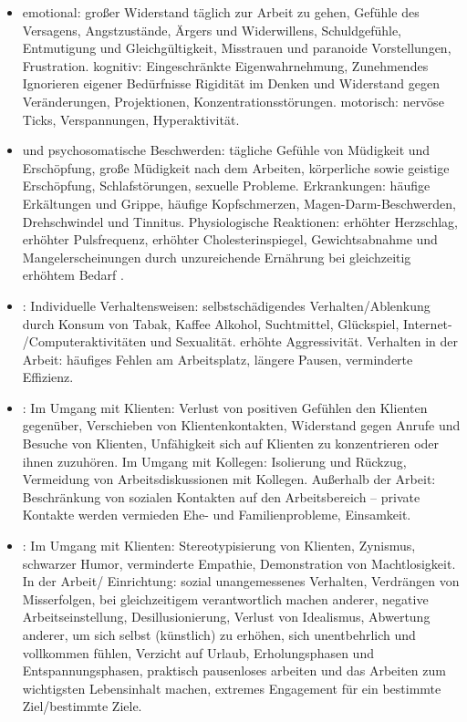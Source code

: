 \begin{itemize}
  \item {}
  emotional: großer Widerstand täglich zur Arbeit zu gehen,
  Gefühle des Versagens, Angstzustände, Ärgers und Widerwillens,
  Schuldgefühle, Entmutigung und Gleichgültigkeit, Misstrauen
  und paranoide Vorstellungen, Frustration. kognitiv:
  Eingeschränkte Eigenwahrnehmung, Zunehmendes Ignorieren
  eigener Bedürfnisse
  Rigidität im Denken und Widerstand gegen Veränderungen,
  Projektionen, Konzentrationsstörungen. motorisch: nervöse
  Ticks, Verspannungen, Hyperaktivität.
  \item {} und
  psychosomatische Beschwerden: tägliche Gefühle von Müdigkeit
  und Erschöpfung, große Müdigkeit nach dem Arbeiten, körperliche sowie geistige Erschöpfung,
  Schlafstörungen, sexuelle Probleme. Erkrankungen: häufige
  Erkältungen und Grippe, häufige Kopfschmerzen,
  Magen-Darm-Beschwerden, Drehschwindel und Tinnitus. Physiologische Reaktionen: erhöhter
  Herzschlag, erhöhter Pulsfrequenz, erhöhter Cholesterinspiegel, Gewichtsabnahme und
    Mangelerscheinungen durch unzureichende Ernährung bei
    gleichzeitig erhöhtem Bedarf
.
  \item {}:
  Individuelle Verhaltensweisen: 
  selbstschädigendes Verhalten/Ablenkung durch Konsum von Tabak, Kaffee 
    Alkohol, Suchtmittel, Glückspiel, Internet-
    /Computeraktivitäten und Sexualität. erhöhte
  Aggressivität. Verhalten in der Arbeit: häufiges Fehlen am
  Arbeitsplatz, längere Pausen, verminderte Effizienz.
  \item {}:
  Im Umgang mit Klienten: Verlust von positiven Gefühlen den
  Klienten gegenüber, Verschieben von Klientenkontakten,
  Widerstand gegen Anrufe und Besuche von Klienten,
  Unfähigkeit sich auf Klienten zu konzentrieren oder ihnen
  zuzuhören. Im Umgang mit Kollegen: Isolierung und Rückzug,
  Vermeidung von Arbeitsdiskussionen mit Kollegen. Außerhalb
  der Arbeit: Beschränkung von sozialen Kontakten auf den
  Arbeitsbereich – private Kontakte werden vermieden Ehe-
  und Familienprobleme, Einsamkeit.
  
  \item {}:
  Im Umgang mit Klienten: Stereotypisierung von Klienten,
  Zynismus, schwarzer Humor, verminderte Empathie,
  Demonstration von Machtlosigkeit. In der Arbeit/
  Einrichtung: sozial unangemessenes Verhalten, Verdrängen
  von Misserfolgen, bei gleichzeitigem verantwortlich machen
  anderer, negative Arbeitseinstellung, Desillusionierung,
  Verlust von Idealismus, Abwertung anderer, um sich selbst
  (künstlich) zu erhöhen, sich unentbehrlich und vollkommen
  fühlen, Verzicht auf Urlaub, Erholungsphasen und
  Entspannungsphasen, praktisch pausenloses arbeiten und das
  Arbeiten zum wichtigsten Lebensinhalt machen, extremes
  Engagement für ein bestimmte Ziel/bestimmte Ziele.
\end{itemize}

